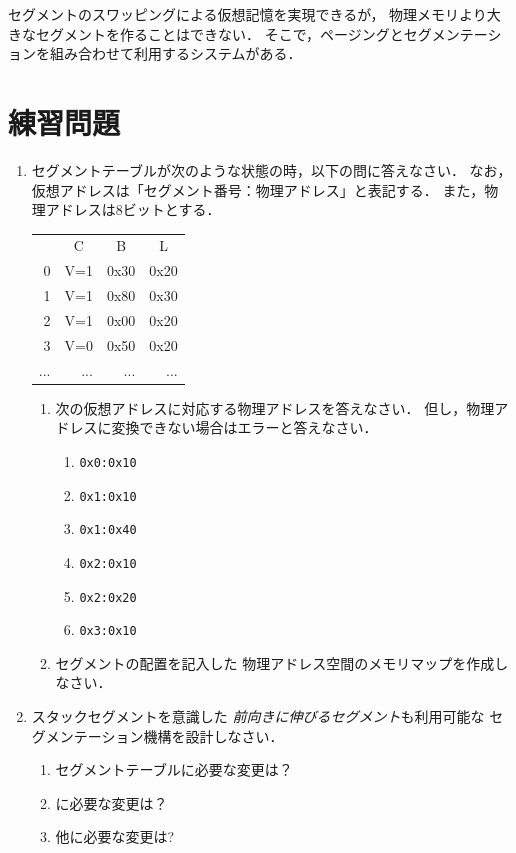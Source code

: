セグメントのスワッピングによる仮想記憶を実現できるが，
物理メモリより大きなセグメントを作ることはできない．
そこで，ページングとセグメンテーションを組み合わせて利用するシステムがある．

\section*{練習問題}
\begin{enumerate}
  \renewcommand{\labelenumi}{\ttfamily\arabic{chapter}.\arabic{enumi}}
  \setlength{\leftskip}{1em}
\item セグメントテーブルが次のような状態の時，以下の問に答えなさい．
  なお，仮想アドレスは「セグメント番号：物理アドレス」と表記する．
  また，物理アドレスは8ビットとする．
  \begin{center}
    \begin{tabular}{r |r|r|r|}
      \multicolumn{1}{c}{} &
      \multicolumn{1}{c}{C} &
      \multicolumn{1}{c}{B} &
      \multicolumn{1}{c}{L} \\
      \cline{2-4}
      0   & V=1 & 0x30 & 0x20 \\
      1   & V=1 & 0x80 & 0x30 \\
      2   & V=1 & 0x00 & 0x20 \\
      3   & V=0 & 0x50 & 0x20 \\
      ... & ... & ... & ... \\
      \cline{2-4}
    \end{tabular}
  \end{center}
  \begin{enumerate}
  \item 次の仮想アドレスに対応する物理アドレスを答えなさい．
    但し，物理アドレスに変換できない場合はエラーと答えなさい．
    \begin{enumerate}
    \item \texttt{0x0:0x10}
    \item \texttt{0x1:0x10}
    \item \texttt{0x1:0x40}
    \item \texttt{0x2:0x10}
    \item \texttt{0x2:0x20}
    \item \texttt{0x3:0x10}
    \end{enumerate}
  \item セグメントの配置を記入した
    物理アドレス空間のメモリマップを作成しなさい．
  \end{enumerate}
  \item スタックセグメントを意識した
    \emph{前向きに伸びるセグメント}も利用可能な
    セグメンテーション機構を設計しなさい．
    \begin{enumerate}
    \item セグメントテーブルに必要な変更は？
    \item {}に必要な変更は？
    \item 他に必要な変更は?
    \end{enumerate}
\end{enumerate}
